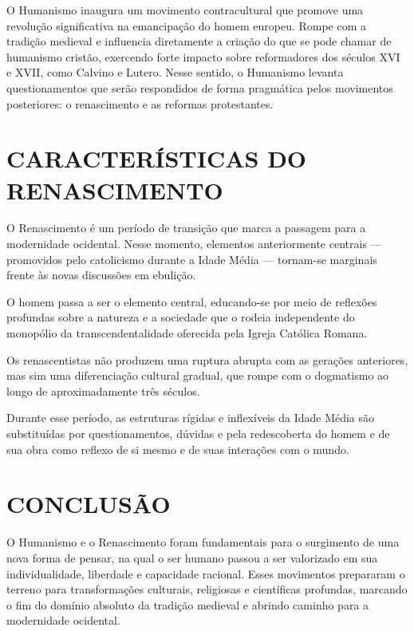 \documentclass[
    article,            %
	12pt,				%
	oneside,			%
	a4paper,			%
	english,			%
	french,				%
	spanish,			%
	brazil				%
	]{abntex2}
\begin{document}
O Humanismo inaugura um movimento contracultural que promove uma revolução significativa na emancipação do homem europeu. Rompe com a tradição medieval e influencia diretamente a criação do que se pode chamar de humanismo cristão, exercendo forte impacto sobre reformadores dos séculos XVI e XVII, como Calvino e Lutero. Nesse sentido, o Humanismo levanta questionamentos que serão respondidos de forma pragmática pelos movimentos posteriores: o renascimento e as reformas protestantes.

\section{CARACTERÍSTICAS DO RENASCIMENTO}
O Renascimento é um período de transição que marca a passagem para a modernidade ocidental. Nesse momento, elementos anteriormente centrais — promovidos pelo catolicismo durante a Idade Média — tornam-se marginais frente às novas discussões em ebulição.

O homem passa a ser o elemento central, educando-se por meio de reflexões profundas sobre a natureza e a sociedade que o rodeia independente do monopólio da transcendentalidade oferecida pela Igreja Católica Romana.

Os renascentistas não produzem uma ruptura abrupta com as gerações anteriores, mas sim uma diferenciação cultural gradual, que rompe com o dogmatismo ao longo de aproximadamente três séculos.

Durante esse período, as estruturas rígidas e inflexíveis da Idade Média são substituídas por questionamentos, dúvidas e pela redescoberta do homem e de sua obra como reflexo de si mesmo e de suas interações com o mundo.

\section{CONCLUSÃO}
O Humanismo e o Renascimento foram fundamentais para o surgimento de uma nova forma de pensar, na qual o ser humano passou a ser valorizado em sua individualidade, liberdade e capacidade racional. Esses movimentos prepararam o terreno para transformações culturais, religiosas e científicas profundas, marcando o fim do domínio absoluto da tradição medieval e abrindo caminho para a modernidade ocidental.


% 
\end{document}
